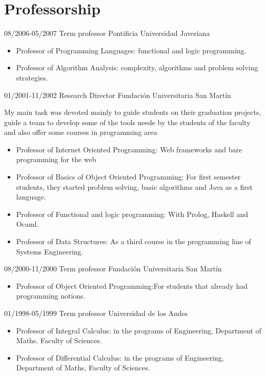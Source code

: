 \section{Professorship}
\begin{entrylist}
  \entry
    {08/2006-05/2007}
    {Term professor}
    {Pontificia Universidad Javeriana}
    {\begin{itemize}
       \item{Professor of Programming Languages: functional and logic programming.}
       \item{Professor of Algorithm Analysis: complexity, algorithms and problem solving strategies.}
     \end{itemize}}
  \entry
    {01/2001-11/2002}
    {Research Director}
    {Fundación Universitaria San Martín}
    {My main task was devoted mainly to guide students on their
    graduation projects, guide a team to develop some of the tools
    neede by the students of the faculty and also offer some courses
    in programming area
      \begin{itemize}      
       \item{Professor of Internet Oriented Programming: Web frameworks and bare programming for the web}
       \item{Professor of Basics of Object Oriented Programming: For first semester students, they 
       started problem solving, basic algorithms and Java as a first language.}
       \item{Professor of Functional and logic programming: With Prolog, Haskell and Ocaml.}
       \item{Professor of Data Structures: As a third course in the programming line of Systems Engineering.}
     \end{itemize}}
  \entry
     {08/2000-11/2000}
     {Term professor}
     {Fundación Universitaria San Martín}
     {\begin{itemize}
        \item{Professor of Object Oriented Programming:For students that already had programming notions.}
      \end{itemize}}
  \entry
    {01/1998-05/1999}
    {Term professor}
    {Universidad de los Andes}
    {\begin{itemize}
       \item{Professor of Integral Calculus: in the programs of Engineering, Department of Maths, Faculty of Sciences.}
       \item{Professor of Differential Calculus: in the programs of Engineering, Department of Maths, Faculty of Sciences.}
     \end{itemize}}
\end{entrylist}
